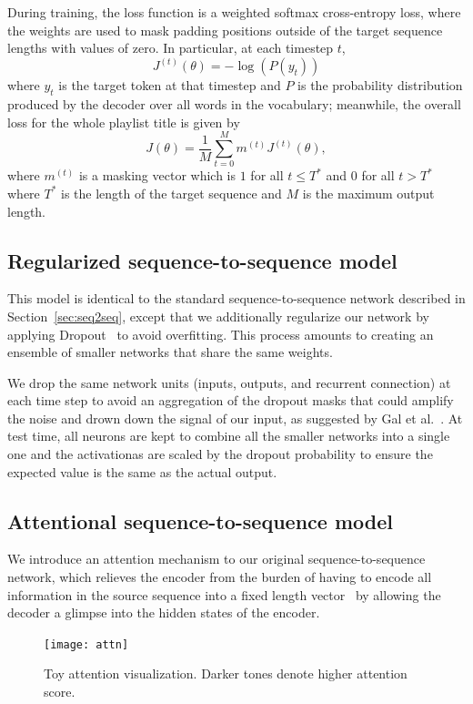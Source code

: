 \documentclass{article} %
\begin{document}
During training, the loss function is a weighted softmax cross-entropy loss, where the weights are used to mask padding positions outside of the target sequence lengths with values of zero. In particular, at each timestep $t$, 
\[
    J^{(t)}(\theta) = -\log(P(y_t))
\]
where $y_t$ is the target token at that timestep and $P$ is the probability distribution produced by the decoder over all words in the vocabulary; meanwhile, the overall loss for the whole playlist title is given by 
\[
    J(\theta) = \frac{1}{M}\sum_{t=0}^{M} m^{(t)}J^{(t)}(\theta),
\]
where $m^{(t)}$ is a masking vector which is $1$ for all $t \le T^*$ and $0$ for all $t > T^*$ where $T^{*}$ is the length of the target sequence and $M$ is the maximum output length. 

\subsection{Regularized sequence-to-sequence model}
This model is identical to the standard sequence-to-sequence network described in Section~\ref{sec:seq2seq}, except that we additionally regularize our network by applying Dropout~\cite{srivastava2014dropout} to avoid overfitting.
This process amounts to creating an ensemble of smaller networks that share the same weights. 

We drop the same network units (inputs, outputs, and recurrent connection) at each time step to avoid an aggregation of the dropout masks that could amplify the noise and drown down the signal of our input, as suggested by Gal et al.~\cite{gal2016theoretically}. 
At test time, all neurons are kept to combine all the smaller networks into a single one and the activationas are scaled by the dropout probability to ensure the expected value is the same as the actual output.  

\subsection{Attentional sequence-to-sequence model}
We introduce an attention mechanism to our original sequence-to-sequence network, which relieves the encoder from the burden of having to encode all information in the source sequence into a fixed length vector~\cite{bahdanau2014neural} by allowing the decoder a glimpse into the hidden states of the encoder.
\begin{figure}[h]
\centering
\texttt{[image: attn]}
\caption{Toy attention visualization. Darker tones denote higher attention score.}
\label{img:attn}
\end{figure}
\end{document}

